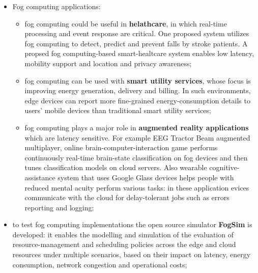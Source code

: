 \documentclass[oneside]{article}
\begin{document}
\begin{itemize}
    \item Fog computing applications:
    \begin{itemize}
        \item fog computing could be useful in \textbf{helathcare}, in which real-time processing and event response are critical. One proposed system utilizes fog computing to detect, predict and prevent falls by stroke patients. A propsed fog computing-based smart-healtcare system enables low latency, mobility support and location and privacy awareness;
        \item fog computing can be used with \textbf{smart utility services}, whose focus is improving energy generation, delivery and billing. In such environments, edge devices can report more fine-grained energy-consumption details to users' mobile devices than traditional smart utility services;
        \item fog computing plays a major role in \textbf{augmented reality applications} which are latency sensitive. For example EEG Tractor Beam augmented multiplayer, online brain-computer-interaction game performs continuously real-time brain-state classification on fog devices and then tunes classification models on cloud servers. Also wearable cognitive-assistance system that uses Google Glass devices helps people with reduced mental acuity perform various tasks: in these application evices communicate with the cloud for delay-tolerant jobs such as errors reporting and logging;
    \end{itemize}
    
    \item to test fog computing implementations the open source simulator \textbf{FogSim} is developed: it enables the modelling and simulation of the evaluation of resource-management and scheduling policies across the edge and cloud resources under multiple scenarios, based on their impact on latency, energy consumption, network congestion and operational costs;
    

\end{itemize}
\end{document}
